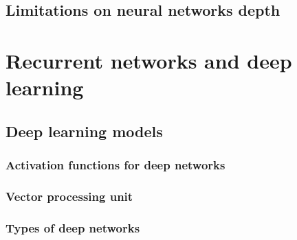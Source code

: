 \subsection{Limitations on neural networks depth}


\section{Recurrent networks and deep learning}

\subsection{Deep learning models}
\subsubsection{Activation functions for deep networks}
\subsubsection{Vector processing unit}
\subsubsection{Types of deep networks}

